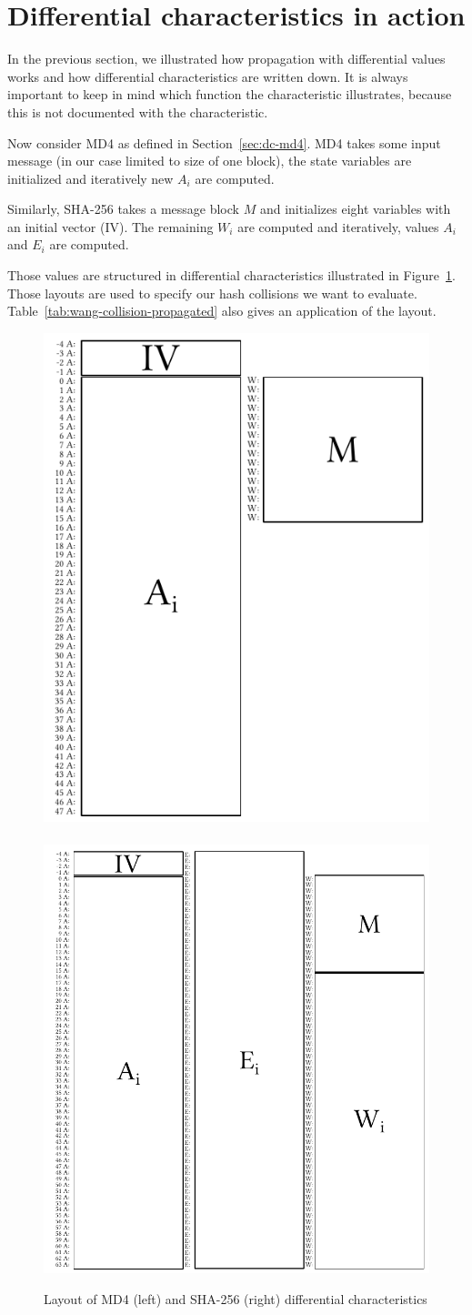 \section{Differential characteristics in action}
\label{sec:dc-actual-chars}
%
In the previous section, we illustrated how propagation with differential values
works and how differential characteristics are written down. It is always
important to keep in mind which function the characteristic illustrates,
because this is not documented with the characteristic.

Now consider MD4 as defined in Section~\ref{sec:dc-md4}. MD4 takes some input
message (in our case limited to size of one block), the state variables
are initialized and iteratively new $A_i$ are computed.

Similarly, SHA-256 takes a message block $M$ and initializes eight
variables with an initial vector (IV). The remaining $W_i$ are computed
and iteratively, values $A_i$ and $E_i$ are computed.

Those values are structured in differential characteristics illustrated
in Figure~\ref{img:char-layouts}. Those layouts are used to specify our
hash collisions we want to evaluate. Table~\ref{tab:wang-collision-propagated}
also gives an application of the layout.

\begin{figure}[!ht]
  \begin{center}
    \includegraphics[width=0.4\linewidth]{img/md4_layout.pdf}
    ~~
    \includegraphics[width=0.5\linewidth]{img/sha256_layout.pdf}
    \caption{Layout of MD4 (left) and SHA-256 (right) differential characteristics}
    \label{img:char-layouts}
  \end{center}
\end{figure}


